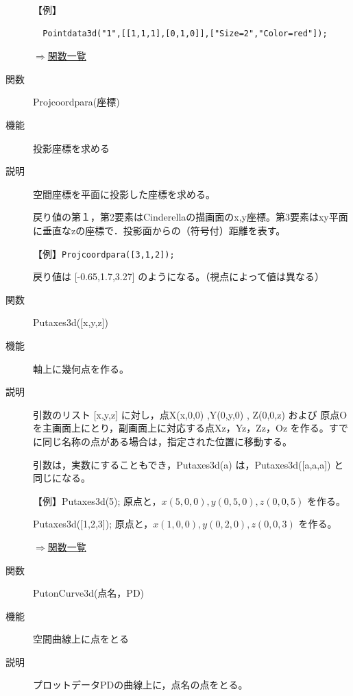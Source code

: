 \documentclass[papersize,a4paper,12pt,uplatex]{jsarticle}
\begin{document}
\begin{description}
【例】
\begin{verbatim}
  Pointdata3d("1",[[1,1,1],[0,1,0]],["Size=2","Color=red"]);
\end{verbatim}
\vspace{\baselineskip}

\begin{flushright} \hyperlink{functionlist}{$\Rightarrow$関数一覧}\end{flushright}

\hypertarget{projcoordpara}{}
\item[関数]  Projcoordpara(座標)
\item[機能]  投影座標を求める
\item[説明]  空間座標を平面に投影した座標を求める。

戻り値の第１，第2要素はCinderellaの描画面のx,y座標。第3要素はxy平面に垂直なzの座標で．投影面からの（符号付）距離を表す。

\vspace{\baselineskip}
【例】\verb|Projcoordpara([3,1,2]);|

 戻り値は  [-0.65,1.7,3.27]   のようになる。（視点によって値は異なる）


\vspace{\baselineskip}
\hypertarget{putaxes3d}{}
\item[関数]  Putaxes3d([x,y,z])
\item[機能]  軸上に幾何点を作る。
\item[説明]  引数のリスト [x,y,z] に対し，点X(x,0,0) ,Y(0,y,0) , Z(0,0,z) および 原点Oを主画面上にとり，副画面上に対応する点Xz，Yz，Zz，Oz を作る。すでに同じ名称の点がある場合は，指定された位置に移動する。

引数は，実数にすることもでき，Putaxes3d(a) は，Putaxes3d([a,a,a]) と同じになる。
  
\vspace{\baselineskip}
【例】Putaxes3d(5);  原点と，$x(5,0,0),y(0,5,0),z(0,0,5)$ を作る。

 Putaxes3d([1,2,3]);  原点と，$x(1,0,0),y(0,2,0),z(0,0,3)$ を作る。

\begin{flushright} \hyperlink{functionlist}{$\Rightarrow$関数一覧}\end{flushright}

\vspace{\baselineskip}
\hypertarget{putonCurve3d}{}
\item[関数]  PutonCurve3d(点名，PD)
\item[機能]  空間曲線上に点をとる
\item[説明]  プロットデータPDの曲線上に，点名の点をとる。


\end{description}
\end{document}
